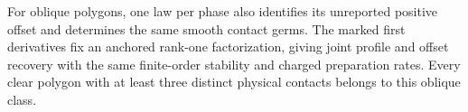 For oblique polygons, one law per phase also identifies its unreported
positive offset and determines the same smooth contact germs.  The
marked first derivatives fix an anchored rank-one factorization, giving
joint profile and offset recovery with the same finite-order stability
and charged preparation rates.  Every clear polygon with at least three
distinct physical contacts belongs to this oblique class.
